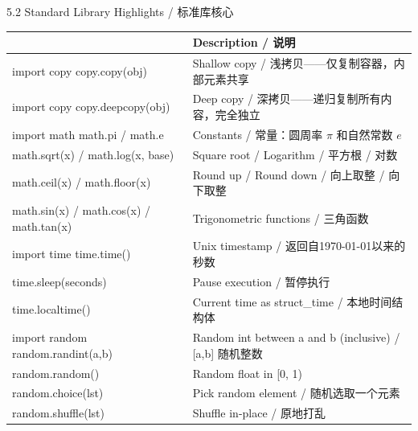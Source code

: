\documentclass[11pt,a4paper]{report}
\begin{document}
\begin{cmdsection}{5.2  Standard Library Highlights / 标准库核心}
\normalsize\renewcommand{\arraystretch}{1.4}
\centering
\begin{tabularx}{\textwidth}{@{}>{\ttfamily}l>{\raggedright\arraybackslash}X@{}}
\toprule
\multicolumn{1}{@{}l}{\textbf{Syntax}} & \textbf{Description / 说明} \\ \midrule
import copy \newline copy.copy(obj)   & Shallow copy / 浅拷贝——仅复制容器，内部元素共享 \\
import copy \newline copy.deepcopy(obj) & Deep copy / 深拷贝——递归复制所有内容，完全独立 \\
import math \newline math.pi / math.e & Constants / 常量：圆周率 $\pi$ 和自然常数 $e$ \\
math.sqrt(x) / math.log(x, base)      & Square root / Logarithm / 平方根 / 对数 \\
math.ceil(x) / math.floor(x)          & Round up / Round down / 向上取整 / 向下取整 \\
math.sin(x) / math.cos(x) / math.tan(x) & Trigonometric functions / 三角函数 \\
import time \newline time.time()      & Unix timestamp / 返回自1970-01-01以来的秒数 \\
time.sleep(seconds)                    & Pause execution / 暂停执行 \\
time.localtime()                       & Current time as struct\_time / 本地时间结构体 \\
import random \newline random.randint(a,b) & Random int between a and b (inclusive) / [a,b] 随机整数 \\
random.random()                        & Random float in [0, 1) \\
random.choice(lst)                     & Pick random element / 随机选取一个元素 \\
random.shuffle(lst)                    & Shuffle in-place / 原地打乱 \\
\bottomrule
\end{tabularx}
\end{cmdsection}
\end{document}
